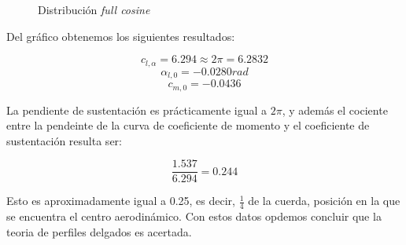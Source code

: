 \documentclass[10pt, a4paper]{article}
\begin{document}
\begin{figure}[H]
  \begin{center}
    \begin{center}
      \caption{Distribución \textit{full cosine}}
      \label{fig:validationPlot}
    \end{center}
  \end{center}
\end{figure}

Del gráfico obtenemos los siguientes resultados:

\[ c_{l,\alpha} = 6.294 \approx 2\pi = 6.2832 \]
\[ \alpha_{l,0} = -0.0280 rad \]
\[ c_{m,0} = -0.0436 \]

La pendiente de sustentación es prácticamente igual a $2\pi$, y además el cociente entre la pendeinte de la curva de coeficiente de momento y el coeficiente de sustentación resulta ser:

\[ \frac{1.537}{6.294} = 0.244 \]

Esto es aproximadamente igual a 0.25, es decir, $\frac{1}{4}$ de la cuerda, posición en la que se encuentra el centro aerodinámico. Con estos datos opdemos concluir que la teoria de perfiles delgados es acertada.
\end{document}
